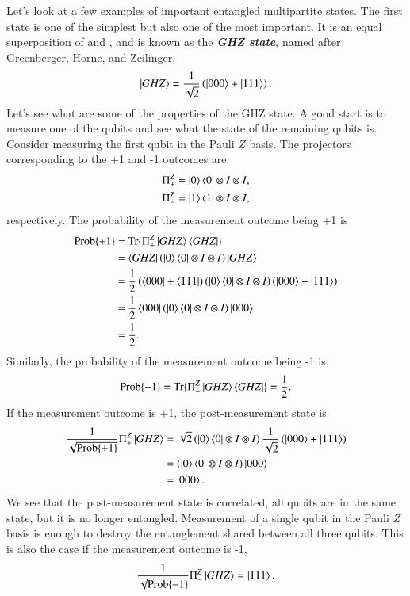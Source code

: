Let's look at a few examples of important entangled multipartite states.
The first state is one of the simplest but also one of the most important.
It is an equal superposition of  and , and is known as the \textit{\textbf{GHZ state}}, named after Greenberger, Horne, and Zeilinger,
\begin{equation}
    \left| GHZ \right\rangle = \frac{1}{\sqrt{2}} \left( \left| 000 \right\rangle + \left| 111 \right\rangle \right).
\end{equation}
Let's see what are some of the properties of the GHZ state.
A good start is to measure one of the qubits and see what the state of the remaining qubits is.
Consider measuring the first qubit in the Pauli $Z$ basis.
The projectors corresponding to the +1 and -1 outcomes are
\begin{align}
    \Pi^Z_+ & = \left| 0 \right\rangle\left\langle 0 \right| \otimes I \otimes I, \\
    \Pi^Z_- & = \left| 1 \right\rangle\left\langle 1 \right| \otimes I \otimes I,
\end{align}
respectively.
The probability of the measurement outcome being +1 is
\begin{align}
    \text{Prob} \{+1\} & = \text{Tr} \{ \Pi^Z_+ \left| GHZ \right\rangle\left\langle GHZ \right| \} \nonumber\\
    & = \left\langle GHZ \right| \left( \left| 0 \right\rangle\left\langle 0 \right| \otimes I \otimes I \right) \left| GHZ \right\rangle \nonumber\\
    & = \frac{1}{2} \left( \left\langle 000 \right| + \left\langle 111 \right| \right) \left( \left| 0 \right\rangle\left\langle 0 \right| \otimes I \otimes I \right) \left( \left| 000 \right\rangle + \left| 111 \right\rangle \right) \nonumber\\
     & = \frac{1}{2} \left\langle 000 \right| \left( \left| 0 \right\rangle\left\langle 0 \right| \otimes I \otimes I \right) \left| 000 \right\rangle \nonumber\\
     & = \frac{1}{2}.
\end{align}
Similarly, the probability of the measurement outcome being -1 is
\begin{equation}
    \text{Prob}\{-1\} = \text{Tr}\{\Pi^Z_-\left| GHZ \right\rangle\left\langle GHZ \right|\} = \frac{1}{2}.
\end{equation}
If the measurement outcome is +1, the post-measurement state is
\begin{align}
    \frac{1}{\sqrt{\text{Prob}\{+1\}}} \Pi^Z_+ \left| GHZ \right\rangle & = \sqrt{2} \left( \left| 0 \right\rangle\left\langle 0 \right| \otimes I \otimes I \right) \frac{1}{\sqrt{2}} \left( \left| 000 \right\rangle + \left| 111 \right\rangle \right) \nonumber\\
    & = \left( \left| 0 \right\rangle\left\langle 0 \right| \otimes I \otimes I \right) \left| 000 \right\rangle \nonumber\\
    & = \left| 000 \right\rangle.
\end{align}
We see that the post-measurement state is correlated, all qubits are in the same state, but it is no longer entangled.
Measurement of a single qubit in the Pauli $Z$ basis is enough to destroy the entanglement shared between all three qubits.
This is also the case if the measurement outcome is -1,
\begin{equation}
    \frac{1}{\sqrt{\text{Prob}\{-1\}}} \Pi^Z_- \left| GHZ \right\rangle = \left| 111 \right\rangle.
\end{equation}

